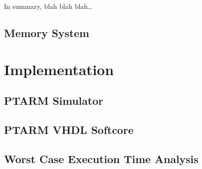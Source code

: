 In summary, blah blah blah\ldots
\subsection{Memory System}
\label{subsection:memory_system}


\section{Implementation}
\subsection{PTARM Simulator}
\label{subsection:ptarm_sim}

\subsection{PTARM VHDL Softcore}
\label{subsection:ptarm_vhdl_softcore}

\subsection{Worst Case Execution Time Analysis}
\label{sec:wcet}